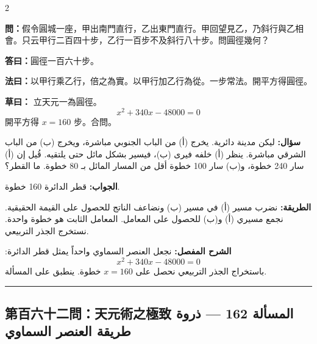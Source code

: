 \documentclass[11pt,a4paper]{article}
\newcommand{\ar}[1]{\arabicfont\beginR #1\endR}
\newcommand{\arb}[1]{\textbf{\arabicfont\beginR #1\endR}}
\newcommand{\longline}{\noindent\rule{\textwidth}{0.4pt}}
\newcommand{\arnote}[1]{\textcolor{arabicblue}{\ar{#1}}}
\newcommand{\wen}[1]{\par\noindent\textbf{\textcolor{probcolor}{問：}}{#1}\par}
\newcommand{\da}[1]{\par\noindent\textbf{\textcolor{anscolor}{答曰：}}{#1}\par}
\newcommand{\fayue}[1]{\par\noindent\textbf{\textcolor{methodcolor}{法曰：}}{#1}\par}
\newcommand{\caoyue}[1]{\par\noindent\textbf{草曰：}{#1}\par}
\newcommand{\arwen}[1]{\par\noindent\arb{سؤال: }\arnote{#1}\par}
\newcommand{\arjwb}[1]{\par\noindent\arb{الجواب: }\arnote{#1}\par}
\newcommand{\arqwd}[1]{\par\noindent\arb{الطريقة: }\arnote{#1}\par}
\newcommand{\arshr}[1]{\par\noindent\arb{الشرح المفصل: }\arnote{#1}\par}
\begin{document}
\begin{paracol}{2}

\begin{leftcolumn}
\wen{假令圓城一座，甲出南門直行，乙出東門直行。甲回望見乙，乃斜行與乙相會。只云甲行二百四十步，乙行一百步不及斜行八十步。問圓徑幾何？}

\da{圓徑一百六十步。}

\fayue{以甲行乘乙行，倍之為實。以甲行加乙行為從。一步常法。開平方得圓徑。}

\caoyue{
立天元一為圓徑。
$$x^2 + 340x - 48000 = 0$$
開平方得 $x = 160$ 步。合問。}
\end{leftcolumn}

\begin{rightcolumn}
\arwen{ليكن مدينة دائرية. يخرج (أ) من الباب الجنوبي مباشرة، ويخرج (ب) من الباب الشرقي مباشرة. ينظر (أ) خلفه فيرى (ب)، فيسير بشكل مائل حتى يلتقيه. قُيل إن (أ) سار 240 خطوة، و(ب) سار 100 خطوة أقل من المسار المائل بـ 80 خطوة. ما القطر؟}

\arjwb{قطر الدائرة 160 خطوة.}

\arqwd{نضرب مسير (أ) في مسير (ب) ونضاعف الناتج للحصول على القيمة الحقيقية. نجمع مسيري (أ) و(ب) للحصول على المعامل. المعامل الثابت هو خطوة واحدة. نستخرج الجذر التربيعي.}

\arshr{نجعل العنصر السماوي واحداً يمثل قطر الدائرة:
$$x^2 + 340x - 48000 = 0$$
باستخراج الجذر التربيعي نحصل على $x = 160$ خطوة. ينطبق على المسألة.}
\end{rightcolumn}

\end{paracol}

\vspace{0.3cm}
\longline

\subsection*{第百六十二問：天元術之極致 \hfill \ar{المسألة 162 — ذروة طريقة العنصر السماوي}}
\end{document}
